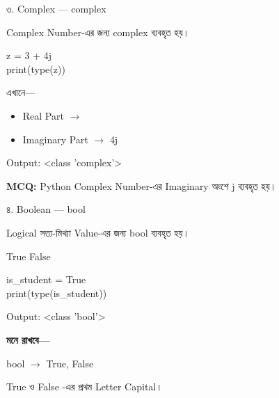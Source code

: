 \noindent
\begin{minipage}[t]{0.49\linewidth}

\begin{examplebox}{৩. Complex — \textenglish{\ttfamily complex}}

Complex Number-এর জন্য
\textenglish{\ttfamily complex}
ব্যবহৃত হয়।

\begin{codebox}
\begin{english}
\ttfamily
z = 3 + 4j\\
print(type(z))
\end{english}
\end{codebox}

এখানে—

\begin{itemize}
\item Real Part
\(\longrightarrow\)
\textenglish{}

\item Imaginary Part
\(\longrightarrow\)
\textenglish{\ttfamily 4j}
\end{itemize}

Output:
\textenglish{\ttfamily \textless class 'complex'\textgreater}

\medskip

\textbf{MCQ:}
Python Complex Number-এর Imaginary অংশে
\textenglish{\ttfamily j}
ব্যবহৃত হয়।

\end{examplebox}

\end{minipage}
\hfill
\begin{minipage}[t]{0.49\linewidth}

\begin{examplebox}{৪. Boolean — \textenglish{\ttfamily bool}}

Logical সত্য-মিথ্যা Value-এর জন্য
\textenglish{\ttfamily bool}
ব্যবহৃত হয়।

\begin{center}
\textenglish{\ttfamily True}
\qquad
\textenglish{\ttfamily False}
\end{center}

\begin{codebox}
\begin{english}
\ttfamily
is\_student = True\\
print(type(is\_student))
\end{english}
\end{codebox}

Output:
\textenglish{\ttfamily \textless class 'bool'\textgreater}

\medskip

\textbf{মনে রাখবে—}

\begin{center}
\textenglish{\ttfamily bool}
\(\longrightarrow\)
\textenglish{\ttfamily True, False}
\end{center}

\textenglish{\ttfamily True}
ও
\textenglish{\ttfamily False}
-এর প্রথম Letter Capital।

\end{examplebox}

\end{minipage}

